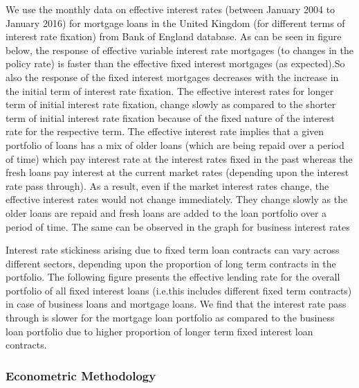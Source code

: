 \documentclass[12pt]{article}
\numberwithin{equation}{section}
\begin{document}
We use the monthly data on effective interest rates (between January 2004 to January 2016)  for mortgage loans in the United Kingdom (for different terms of interest rate fixation) from Bank of England database.
As can be seen in figure below, the response of effective variable interest rate mortgages (to changes in the policy rate) is faster than the effective fixed interest mortgages (as expected).So also the response of the fixed interest mortgages decreases with the increase in the initial term of interest rate fixation.
The effective interest rates for longer term of initial interest rate fixation, change slowly as compared to the shorter term of initial interest rate fixation  because of the fixed nature of the interest rate for the respective term. The effective interest rate implies that a given portfolio of loans has a mix of older loans (which are being repaid over a period of time) which pay interest rate at the interest rates fixed in the past whereas the fresh loans pay interest at the current market rates (depending upon the interest rate pass through). As a result, even if the market interest rates change, the effective interest rates would not change immediately. They change slowly as the older loans are repaid and fresh loans are added to the loan portfolio over a period of time. The same can be observed in the graph for business interest rates

Interest rate stickiness arising due to fixed term loan contracts can vary across different sectors, depending upon the proportion of long term contracts in the portfolio. The following figure presents the effective lending rate for the overall portfolio of all fixed interest loans  (i.e.this includes different fixed term contracts) in case of business loans and mortgage loans. We find that the interest rate pass through is slower for the mortgage loan portfolio as compared to the business loan portfolio due to higher proportion of longer term fixed interest loan contracts.

	
	


\subsubsection{Econometric Methodology}
\end{document}
